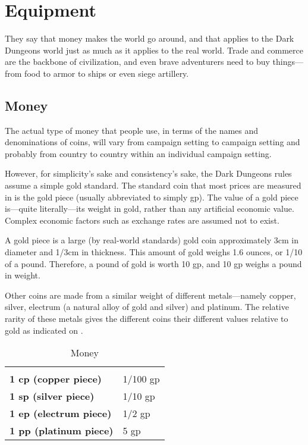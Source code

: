 \chapter[red]{Equipment}
\label{chap:Equipment}
\thispagestyle{plain}

\begin{multicols*}{2}
They say that money makes the world go around, and that applies to the Dark Dungeons world just as much as it applies to the real world. Trade and commerce are the backbone of civilization, and even brave adventurers need to buy things—from food to armor to ships or even siege artillery.

\section{Money}
The actual type of money that people use, in terms of the names and denominations of coins, will vary from campaign setting to campaign setting and probably from country to country within an individual campaign setting.

However, for simplicity’s sake and consistency’s sake, the Dark Dungeons rules assume a simple gold standard. The standard coin that most prices are measured in is the gold piece (usually abbreviated to simply gp). The value of a gold piece is—quite literally—its weight in gold, rather than any artificial economic value. Complex economic factors such as exchange rates are assumed not to exist.

A gold piece is a large (by real-world standards) gold coin approximately 3cm in diameter and 1/3cm in thickness. This amount of gold weighs 1.6 ounces, or 1/10 of a pound. Therefore, a pound of gold is worth 10 gp, and 10 gp weighs a pound in weight.

Other coins are made from a similar weight of different metals—namely copper, silver, electrum (a natural alloy of gold and silver) and platinum. The relative rarity of these metals gives the different coins their different values relative to gold as indicated on .

\begin {table}[H]
	\caption{Money}\label{tab:Money}
	\begin{tabularx}{\columnwidth}{>{\bfseries}YY}
		 &  \\
		1 cp (copper piece) & 1/100 gp \\
		1 sp (silver piece) & 1/10 gp \\
		1 ep (electrum piece) & 1/2 gp \\
		1 pp (platinum piece) & 5 gp \
  \end {tabularx}
\end {table}


\end{multicols*}
